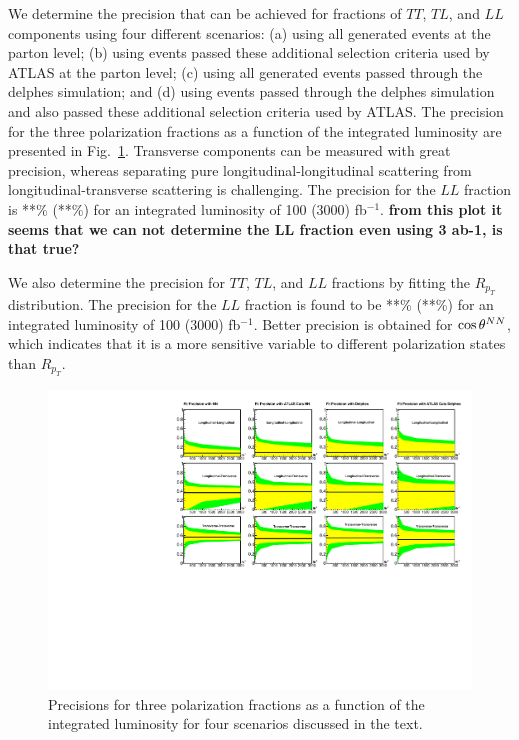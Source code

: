 We determine the precision that can be achieved for fractions of $TT$, $TL$, and $LL$ components using four different scenarios: (a) using all  generated events at the parton level; 
(b) using events passed these additional selection criteria used by ATLAS at the parton level; 
(c) using all generated events passed through the {\sc delphes} simulation; and (d) using events passed through the {\sc delphes} simulation and 
also passed these additional selection criteria used by ATLAS. 
The precision for the three polarization fractions as a function of the integrated luminosity are presented in Fig.~\ref{fig:sensitivity}. 
 Transverse components can be measured with great precision, whereas separating pure longitudinal-longitudinal scattering from longitudinal-transverse scattering is challenging.
The precision for the $LL$ fraction is **\% (**\%) for an integrated luminosity of 100 (3000) fb$^{-1}$. {\bf from this plot it seems that we can not determine the LL fraction even using 3 ab-1, is that true?}

We also determine the precision  for $TT$, $TL$, and $LL$ fractions by fitting the $R_{p_T}$ distribution. 
The precision for the $LL$ fraction is found to be **\% (**\%) for an integrated luminosity of 100 (3000) fb$^{-1}$.
Better precision is obtained for $ \cos \theta^{NN}  $, which indicates that it is a more sensitive variable to different polarization states than $R_{p_T}$.

\begin{figure}
\includegraphics[width=.9\textwidth]{./fig/12_LL_LT_TT.pdf}
\caption{ \label{fig:sensitivity} Precisions for three polarization fractions as a function of the integrated luminosity for four scenarios discussed in the text.}
\end{figure}

